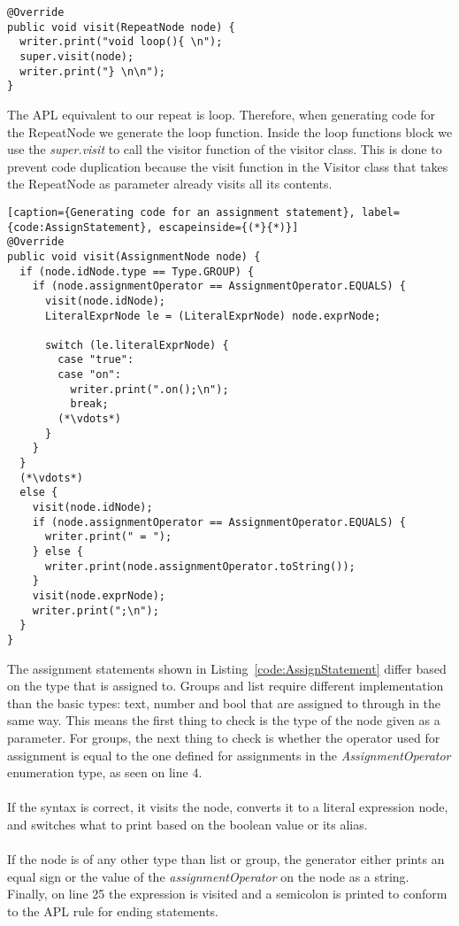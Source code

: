 \begin{lstlisting}[caption={Generating code for the repeat section of PHAL}, label={code:ReapeatGen}]
@Override
public void visit(RepeatNode node) {
  writer.print("void loop(){ \n");
  super.visit(node);
  writer.print("} \n\n");
}
\end{lstlisting}
The APL equivalent to our repeat is loop. Therefore, when generating code for the RepeatNode we generate the loop function. Inside the loop functions block we use the \textit{super.visit} to call the visitor function of the visitor class. This is done to prevent code duplication because the visit function in the Visitor class that takes the RepeatNode as parameter already visits all its contents.
\begin{lstlisting}[caption={Generating code for an assignment statement}, label={code:AssignStatement}, escapeinside={(*}{*)}]
@Override
public void visit(AssignmentNode node) {
  if (node.idNode.type == Type.GROUP) {
    if (node.assignmentOperator == AssignmentOperator.EQUALS) {
      visit(node.idNode);
      LiteralExprNode le = (LiteralExprNode) node.exprNode;

      switch (le.literalExprNode) {
        case "true":
        case "on":
          writer.print(".on();\n");
          break;
        (*\vdots*)
      }
    }
  } 
  (*\vdots*)
  else {
    visit(node.idNode);
    if (node.assignmentOperator == AssignmentOperator.EQUALS) {
      writer.print(" = ");
    } else {
      writer.print(node.assignmentOperator.toString());
    }
    visit(node.exprNode);
    writer.print(";\n");
  }
}
\end{lstlisting}
The assignment statements shown in Listing~\ref{code:AssignStatement} differ based on the type that is assigned to. 
Groups and list require different implementation than the basic types: text, number and bool that are assigned to through in the same way. 
This means the first thing to check is the type of the node given as a parameter. 
For groups, the next thing to check is whether the operator used for assignment is equal to the one defined for assignments in the \textit{AssignmentOperator} enumeration type, as seen on line 4. 
\\\\
If the syntax is correct, it visits the node, converts it to a literal expression node, and switches what to print based on the boolean value or its alias. 
\\\\
If the node is of any other type than list or group, the generator either prints an equal sign or the value of the \textit{assignmentOperator} on the node as a string. 
Finally, on line 25 the expression is visited and a semicolon is printed to conform to the APL rule for ending statements.

